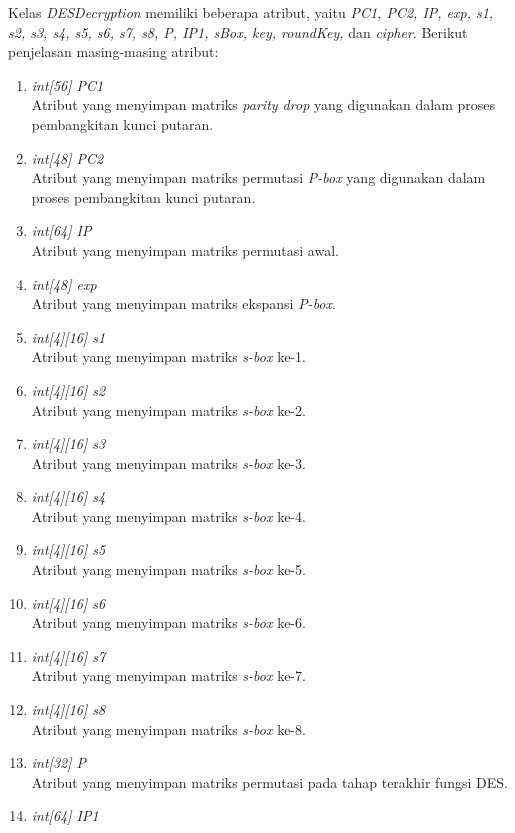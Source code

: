 Kelas \textit{DESDecryption} memiliki beberapa atribut, yaitu \textit{PC1, PC2, IP, exp, s1, s2, s3, s4, s5, s6, s7, s8, P, IP1, sBox, key, roundKey,} dan \textit{cipher}. Berikut penjelasan masing-masing atribut:

\begin{enumerate}
	\item \textit{int[56] PC1} \\
	Atribut yang menyimpan matriks \textit{parity drop} yang digunakan dalam proses pembangkitan kunci putaran.
	\item \textit{int[48] PC2} \\
	Atribut yang menyimpan matriks permutasi \textit{P-box} yang digunakan dalam proses pembangkitan kunci putaran.
	\item \textit{int[64] IP} \\
	Atribut yang menyimpan matriks permutasi awal.
	\item \textit{int[48] exp} \\
	Atribut yang menyimpan matriks ekspansi \textit{P-box}.
	\item \textit{int[4][16] s1} \\
	Atribut yang menyimpan matriks \textit{s-box} ke-1.
	\item \textit{int[4][16] s2} \\
	Atribut yang menyimpan matriks \textit{s-box} ke-2.
	\item \textit{int[4][16] s3} \\
	Atribut yang menyimpan matriks \textit{s-box} ke-3.
	\item \textit{int[4][16] s4} \\
	Atribut yang menyimpan matriks \textit{s-box} ke-4.
	\item \textit{int[4][16] s5} \\
	Atribut yang menyimpan matriks \textit{s-box} ke-5.
	\item \textit{int[4][16] s6} \\
	Atribut yang menyimpan matriks \textit{s-box} ke-6.
	\item \textit{int[4][16] s7} \\
	Atribut yang menyimpan matriks \textit{s-box} ke-7.
	\item \textit{int[4][16] s8} \\
	Atribut yang menyimpan matriks \textit{s-box} ke-8.
	\item \textit{int[32] P} \\
	Atribut yang menyimpan matriks permutasi pada tahap terakhir fungsi DES.
	\item \textit{int[64] IP1} \\

\end{enumerate}
